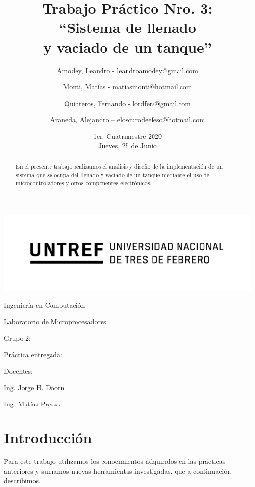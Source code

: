 ﻿\documentclass[a4paper]{article}
\title{Trabajo Práctico Nro. 3:\\``Sistema de llenado\\y vaciado de un tanque''}
\author{Amodey, Leandro - leandroamodey@gmail.com
\and Monti, Matías - matiasmonti@hotmail.com
\and Quinteros, Fernando - lordfers@gmail.com
\and Araneda, Alejandro – eloscurodeefeso@hotmail.com}
\date{1er. Cuatrimestre 2020\\Jueves, 25 de Junio}
\def\teacher{Ing. Jorge H. Doorn
\and Ing. Matías Presso}
\begin{document}
\begin{titlepage}\renewcommand\and\par\centering\makeatletter
    \includegraphics{logo.png}\par
    {\Large Ingeniería en Computación \par}\vspace{0.5cm}
    {\LARGE Laboratorio de Microprocesadores \par}\vfill
    {\huge \@title \par}\vfill
    Grupo 2:\par
    \@author\vfill
    Práctica entregada:\par
    \@date\vfill
    Docentes:\par
    \teacher\vspace{1cm}\makeatother
\end{titlepage}

\begin{abstract}

    En el presente trabajo realizamos el análisis y diseño de la
    implementación de un sistema que se ocupa del llenado y vaciado 
    de un tanque mediante el uso de microcontroladores y otros 
    componentes electrónicos.

\end{abstract}

\section{Introducción}

Para este trabajo utilizamos los conocimientos adquiridos en las 
prácticas anteriores y sumamos nuevas herramientas investigadas, 
que a continuación describimos.


\end{document}
